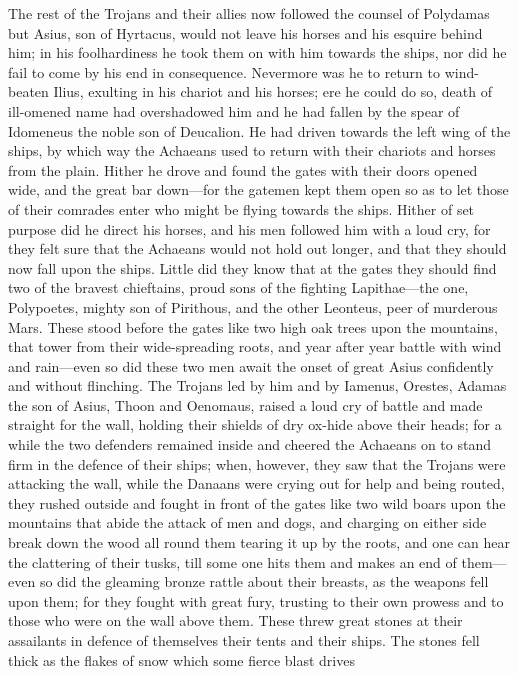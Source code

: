 The rest of the Trojans and their allies now followed the counsel of
Polydamas but Asius, son of Hyrtacus, would not leave his horses and his
esquire behind him; in his foolhardiness he took them on with him towards
the ships, nor did he fail to come by his end in consequence. Nevermore
was he to return to wind-beaten Ilius, exulting in his chariot and his
horses; ere he could do so, death of ill-omened name had overshadowed him
and he had fallen by the spear of Idomeneus the noble son of Deucalion. He
had driven towards the left wing of the ships, by which way the Achaeans
used to return with their chariots and horses from the plain. Hither he
drove and found the gates with their doors opened wide, and the great bar
down—for the gatemen kept them open so as to let those of their
comrades enter who might be flying towards the ships. Hither of set
purpose did he direct his horses, and his men followed him with a loud
cry, for they felt sure that the Achaeans would not hold out longer, and
that they should now fall upon the ships. Little did they know that at the
gates they should find two of the bravest chieftains, proud sons of the
fighting Lapithae—the one, Polypoetes, mighty son of Pirithous, and
the other Leonteus, peer of murderous Mars. These stood before the gates
like two high oak trees upon the mountains, that tower from their
wide-spreading roots, and year after year battle with wind and rain—even
so did these two men await the onset of great Asius confidently and
without flinching. The Trojans led by him and by Iamenus, Orestes, Adamas
the son of Asius, Thoon and Oenomaus, raised a loud cry of battle and made
straight for the wall, holding their shields of dry ox-hide above their
heads; for a while the two defenders remained inside and cheered the
Achaeans on to stand firm in the defence of their ships; when, however,
they saw that the Trojans were attacking the wall, while the Danaans were
crying out for help and being routed, they rushed outside and fought in
front of the gates like two wild boars upon the mountains that abide the
attack of men and dogs, and charging on either side break down the wood
all round them tearing it up by the roots, and one can hear the clattering
of their tusks, till some one hits them and makes an end of them—even
so did the gleaming bronze rattle about their breasts, as the weapons fell
upon them; for they fought with great fury, trusting to their own prowess
and to those who were on the wall above them. These threw great stones at
their assailants in defence of themselves their tents and their ships. The
stones fell thick as the flakes of snow which some fierce blast drives
